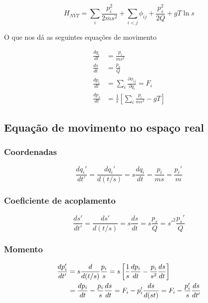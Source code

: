 \documentclass[twoside, a4paper]{article}
\newcommand{\phiij}{\phi_{ij}}
\newcommand{\del}[2]{\frac{\partial #1}{\partial #2}}
\newcommand{\deri}[2]{\frac{d #1}{d #2}}
\begin{document}
\begin{equation}
	H_{NVT} = \sum_i \frac{p_i^2}{2ms^2} + \sum_{i<j} \phiij + \frac{p_s^2}{2Q} + gT \ln s
\end{equation}

O que nos dá as seguintes equações de movimento

\begin{subequations}
	\begin{align}
		\deri{q_i}{t} &= \frac{p_i}{ms^2}\\
		\deri{s}{t} &= \frac{p_s}{Q}\\
		\deri{p_i}{t} &= \sum_i \del{\phiij}{q_i} = F_i \\
		\deri{p_s}{t} &= \frac{1}{s} \left[\sum_i \frac{p_i}{ms^2} - gT\right]
	\end{align}
\end{subequations}

\subsection{Equação de movimento no espaço real}

\subsubsection*{Coordenadas}

\begin{equation}
	\deri{q_i'}{t'} = \deri{q_i'}{(t/s)} = s \deri{q_i}{t} = \frac{p_i}{ms} = \frac{p_i'}{m}
\end{equation}

\subsubsection*{Coeficiente de acoplamento}

\begin{equation}
	\deri{s'}{t'} = \deri{s'}{(t/s)} = s \deri{s}{t} = s\frac{p_s}{Q}= s'^2\frac{p_s'}{Q}
\end{equation}

\subsubsection*{Momento}

\begin{align}
	\deri{p_i'}{t'} &= s \deri{}{(t/s)} \frac{p_i}{s} = s\left[\frac{1}{s}\deri{p_i}{t} - \frac{p_i}{s^2}\deri{s}{t}\right]\notag \\
			&= \deri{p_i}{t} - \frac{p_i}{s}\deri{s}{t} = F_i - p_i' \deri{s}{(st)} = F_i - \frac{p_i'}{s}\frac{ds}{dt'}
\end{align}
\end{document}
